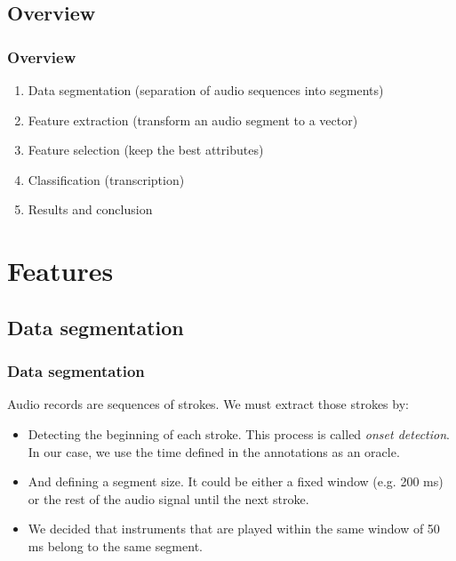 \documentclass{beamer}
\begin{document}
    \subsection{Overview}
    \begin{frame}
        \frametitle{Overview}
        \begin{enumerate}
            \item Data segmentation (separation of audio sequences into segments)
            \item Feature extraction (transform an audio segment to a vector)
            \item Feature selection (keep the best attributes)
            \item Classification (transcription)
            \item Results and conclusion
        \end{enumerate}
    \end{frame}
    
    \section{Features}
    \subsection{Data segmentation}
    \begin{frame}
        \frametitle{Data segmentation}
        Audio records are sequences of strokes. We must extract those strokes by:
        \begin{itemize}
            \item Detecting the beginning of each stroke. This process is called \emph{onset detection}. In our case, we use the time defined in the annotations as an oracle.
            \item And defining a segment size. It could be either a fixed window (e.g. 200 ms) or the rest of the audio signal until the next stroke.
            \item We decided that instruments that are played within the same window of 50 ms belong to the same segment.
        \end{itemize}
    \end{frame}
\end{document}
